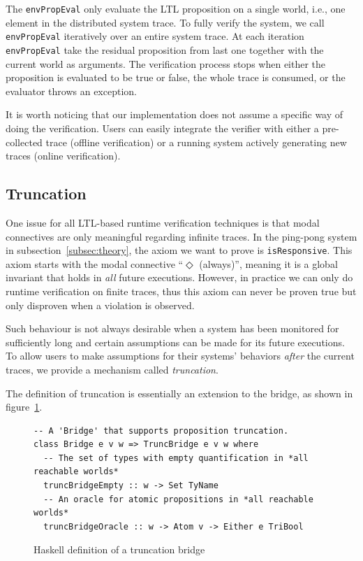 \documentclass[format=acmsmall, nonacm=true, review=true, screen=true]{acmart}
\newcommand{\mycaption}[1]{\Description{#1}\caption{#1}}
\begin{document}
The \texttt{envPropEval} only evaluate the LTL proposition on a single world, i.e., one element in the distributed system trace.
To fully verify the system, we call \texttt{envPropEval} iteratively over an entire system trace.
At each iteration \texttt{envPropEval} take the residual proposition from last one together with the current world as arguments.
The verification process stops when either the proposition is evaluated to be true or false, the whole trace is consumed, or the evaluator throws an exception.

It is worth noticing that our implementation does not assume a specific way of doing the verification.
Users can easily integrate the verifier with either a pre-collected trace (offline verification) or a running system actively generating new traces (online verification).

\subsection{Truncation}

One issue for all LTL-based runtime verification techniques is that modal connectives are only meaningful regarding infinite traces.
In the ping-pong system in subsection~\ref{subsec:theory}, the axiom we want to prove is \texttt{isResponsive}.
This axiom starts with the modal connective ``$\Diamond$ (always)'', meaning it is a global invariant that holds in \textit{all} future executions.
However, in practice we can only do runtime verification on finite traces, thus this axiom can never be proven true but only disproven when a violation is observed.

Such behaviour is not always desirable when a system has been monitored for sufficiently long and certain assumptions can be made for its future executions.
To allow users to make assumptions for their systems' behaviors \textit{after} the current traces, we provide a mechanism called \textit{truncation}.

The definition of truncation is essentially an extension to the bridge, as shown in figure~\ref{fig:truncation-sig}.

\begin{figure}[h]
  {
    \fontsize{10}{12}\selectfont
    \begin{verbatim}
-- A 'Bridge' that supports proposition truncation.
class Bridge e v w => TruncBridge e v w where
  -- The set of types with empty quantification in *all reachable worlds*
  truncBridgeEmpty :: w -> Set TyName
  -- An oracle for atomic propositions in *all reachable worlds*
  truncBridgeOracle :: w -> Atom v -> Either e TriBool
\end{verbatim}
  }
  \mycaption{Haskell definition of a truncation bridge}
  \label{fig:truncation-sig}
\end{figure}
\end{document}
